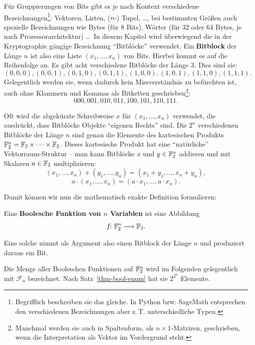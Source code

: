 \begin{refsegment}
Für Gruppierungen von Bits gibt es je nach Kontext verschiedene
Bezeichnungen\footnote{%
   Begrifflich beschreiben sie das gleiche. In Python bzw. SageMath
   entsprechen den verschiedenen Bezeichnungen aber z.\,T. unterschiedliche
   Typen.
}:
Vektoren, Listen, ($n$-) Tupel,
\ldots, bei bestimmten Größen auch spezielle Bezeichnungen wie Bytes
(für 8 Bits), Wörter (für 32 oder
64 Bytes, je nach Prozessorarchitektur) \ldots\
In diesem Kapitel wird überwiegend
die in der Kryptographie gängige Bezeichnung "`Bitblöcke"' verwendet.
Ein {\bf Bitblock} der Länge $n$ ist also eine Liste $(x_1, \ldots, x_n)$ von
Bits. Hierbei kommt es auf die Reihenfolge an. Es gibt acht
verschiedene Bitblöcke der Länge $3$. Dies sind sie:
\[
   (0,0,0), (0,0,1), (0,1,0), (0,1,1), (1,0,0), (1,0,1), (1,1,0), (1,1,1).
\]
Gelegentlich werden sie, wenn dadurch kein Missverständnis zu befürchten ist, auch
ohne Klammern und Kommas als Bitketten\index{Bitkette} geschrieben\footnote{%
   Manchmal werden sie auch in Spaltenform, als $n \times 1$-Matrizen,
   geschrieben, wenn die Interpretation als Vektor\index{Vektor} im Vordergrund steht.
}:
\[
   000, 001, 010, 011, 100, 101, 110, 111.
\]

Oft wird die abgekürzte Schreibweise $x$ für $(x_1, \ldots, x_n)$ verwendet,
die ausdrückt, dass
Bitblöcke Objekte "`eigenen Rechts"' sind. Die $2^n$ verschiedenen
Bitblöcke der Länge $n$ sind genau die Elemente des kartesischen Produkts
$\mathbb{F}_2^n = \mathbb{F}_2 \times \cdots \times \mathbb{F}_2$. Dieses kartesische Produkt
hat eine "`natürliche"' Vektorraum-Struktur\index{Vektorraum} -- man kann Bitblöcke
$x$ und $y \in \mathbb{F}_2^n$ addieren und mit Skalaren $a \in \mathbb{F}_2$ multiplizieren:
\[
   (x_1, \ldots, x_n) + (y_1, \ldots, y_n) =  (x_1 + y_1, \ldots, x_n + y_n),
\]
\[
   a \cdot (x_1, \ldots, x_n) = (a \cdot x_1, \ldots, a \cdot x_n).
\]

Damit können wir nun die mathematisch exakte Definition formulieren:

\begin{definition}\label{def-bool-fkt}
  Eine {\bf Boolesche Funktion von $n$ Variablen} ist eine Abbildung
\[
     f\!\!: \mathbb{F}_2^n \longrightarrow \mathbb{F}_2.
\]
\end{definition}
Eine solche nimmt als Argument also einen Bitblock der Länge $n$
und produziert daraus ein Bit.

Die Menge aller Booleschen Funktionen auf $\mathbb{F}_2^n$ wird im Folgenden gelegentlich
mit $\mathcal{F}_n$ bezeichnet. Nach Satz~\ref{thm-bool-enum} hat sie
$2^{2^n}$ Elemente.


\end{refsegment}
